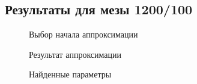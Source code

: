 \documentclass[a4paper,12pt]{article}
\begin{document}
	\subsection{Результаты для мезы 1200/100}
		\begin{figure}[H]
			\caption{Выбор начала аппроксимации}
		\end{figure}
		\begin{figure}[H]
			\caption{Результат аппроксимации}
		\end{figure}
		\begin{figure}[H]
			\caption{Найденные параметры}
		\end{figure}
\newpage
\end{document}
